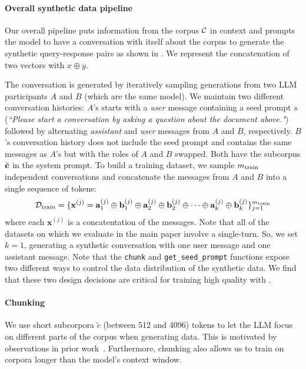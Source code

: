 \paragraph{Overall synthetic data pipeline} Our overall pipeline puts information from the corpus $\mathcal{C}$ in context and prompts the model to have a conversation with itself about the corpus to generate the synthetic query-response pairs as shown in . We represent the concatenation of two vectors with $x \oplus y$.

The conversation is generated by iteratively sampling generations from two LLM participants $A$ and $B$ (which are the same model). We maintain two different conversation histories: $A$'s starts with a \textit{user} message containing a seed prompt $s$ (\eg \textit{``Please start a conversation by asking a question about the document above."}) followed by alternating \textit{assistant} and \textit{user} messages from $A$ and $B$, respectively. $B$'s conversation history does not include the seed prompt and contains the same messages as $A$'s but with the roles of $A$ and $B$ swapped. Both have the subcorpus $\tilde{\mathbf{c}}$ in the system prompt. To build a training dataset, we sample $m_\text{train}$ independent conversations and concatenate the messages from $A$ and $B$ into a single sequence of tokens:
\begin{equation}
	\mathcal{D}_\text{train} =
	\{
	\mathbf{x}^{(j)} =
	\mathbf{a}_1^{(j)} \oplus
	\mathbf{b}_1^{(j)} \oplus
	\mathbf{a}_2^{(j)} \oplus
	\mathbf{b}_2^{(j)} \oplus
	\dots \oplus
	\mathbf{a}_k^{(j)} \oplus
	\mathbf{b}_k^{(j)}
	\}_{j=1}^{m_\text{train}}
    \label{eq:dataset}
\end{equation}
where each $\mathbf{x}^{(j)}$ is a concatentation of the messages.
Note that all of the datasets on which we evaluate in the main paper involve a single-turn. So, we set $k=1$, generating a synthetic conversation with one user message and one assistant message.
Note that the \texttt{chunk} and \texttt{get\_seed\_prompt} functions expose two different ways to control the data distribution of the synthetic data.
We find that these two design decisions are critical for training high quality \artifacts with \method.
\vspace{-2mm}
\paragraph{Chunking}  We use short subcorpora $\tilde{c}$ (between 512 and 4096) tokens to let the LLM focus on different parts of the corpus when generating data.
This is motivated by observations in prior work~\cite{liu2024lost, narayan2025minions}.
Furthermore, chunking also allows us to train \artifacts on corpora longer than the model's context window.
\vspace{-2mm}
